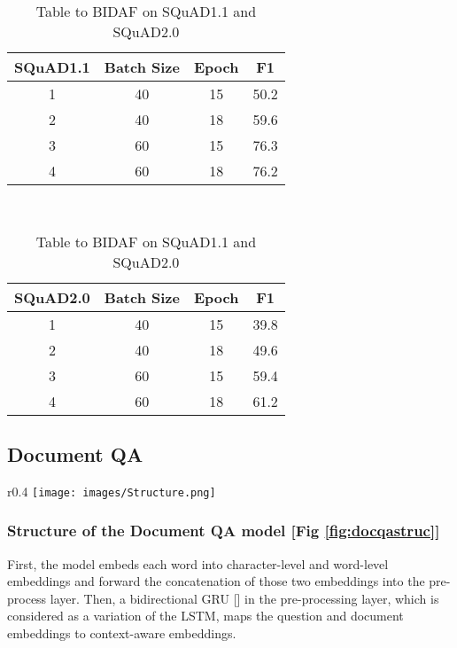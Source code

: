 \documentclass{article}
\begin{document}
    \begin{table}[h!]
     \begin{tabular}{||c c c c||} 
     \hline
     SQuAD1.1 & Batch Size & Epoch & F1 \\ [0.5ex] 
     \hline\hline
     1 & 40 & 15 & 50.2 \\ 
     \hline
     2 & 40 & 18 & 59.6 \\
     \hline
     3 & 60 & 15 & 76.3 \\
     \hline
     4 & 60 & 18 & 76.2 \\
     \hline
    \end{tabular}\ 
    \begin{tabular}{||c c c c||} 
     \hline
     SQuAD2.0 & Batch Size & Epoch & F1 \\ [0.5ex] 
     \hline\hline
     1 & 40 & 15 & 39.8 \\ 
     \hline
     2 & 40 & 18 & 49.6 \\
     \hline
     3 & 60 & 15 & 59.4 \\
     \hline
     4 & 60 & 18 & 61.2 \\
     \hline
    \end{tabular}
    \caption{Table to BIDAF on SQuAD1.1 and SQuAD2.0}
    \label{table:2}
    \end{table}
\subsection{Document QA}
\begin{wrapfigure}{r}{0.4\textwidth} %
    \texttt{[image: images/Structure.png]}
      \centering
      \caption{DocQA Structure []}
      \label{fig:docqastruc}
\end{wrapfigure}

\subsubsection{Structure of the Document QA model [Fig \ref{fig:docqastruc}]}
First, the model embeds each word into character-level and word-level embeddings and forward the concatenation of those two embeddings into the pre-process layer. Then, a bidirectional GRU [] in the pre-processing layer, which is considered as a variation of the LSTM, maps the question and document embeddings to context-aware embeddings. 
\end{document}
